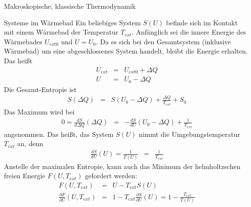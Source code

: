\begin{chapter}{\titlestr}
\begin{section}{Makroskopische, klassische Thermodynamik}
\begin{subsection}{Systeme im Wärmebad}
Ein beliebiges System $S(U)$ befinde sich im Kontakt mit einem Wärmebad der Temperatur $T_{ext}$. Anfänglich sei die innere Energie des
Wärmebades $U_{ext0}$ und $U=U_0$. Da es sich bei den Gesamtsystem (inklusive Wärmebad) um eine abgeschlossenes System handelt, bleibt die Energie erhalten.
Das heißt
\begin{eqnarray*}
U_{ext} &=& U_{ext0}+\Delta Q\\
U &=& U_0-\Delta Q
\end{eqnarray*}
Die Gesamt-Entropie ist
\begin{eqnarray*}
S(\Delta Q) &=& S(U_0-\Delta Q)+\frac{\Delta Q}{T_{ext}}+S_0
\end{eqnarray*}
Das Maximum wird bei
\begin{eqnarray*}
0=\frac {dS}{d\Delta Q}(\Delta Q) &=& -\frac{dS}{dU}(U_0-\Delta Q)+\frac{1}{T_{ext}}
\end{eqnarray*}
angenommen. Das heißt, das System $S(U)$ nimmt die Umgebungstemperatur $T_{ext}$ an, denn
\begin{eqnarray*}
\frac{dS}{dU}(U)=\frac{1}{T(U)}&=&\frac{1}{T_{ext}}
\end{eqnarray*}
Anstelle der maximalen Entropie, kann auch das Minimum der helmholtzschen freien Energie $F(U,T_{ext})$ gefordert werden:
\begin{eqnarray*}
F(U,T_{ext}) &=& U-T_{ext}S(U)\\
\frac{\partial F}{\partial U}(U,T_{ext}) &=& 1-T_{ext}\frac{\partial S}{\partial U}(U)=1-\frac{T_{ext}}{T(U)}
\end{eqnarray*}
\end{subsection}


\end{section}
\end{chapter}
